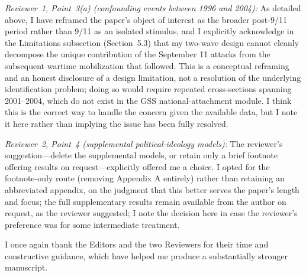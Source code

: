 \documentclass[11pt]{article}
\begin{document}
\textit{Reviewer~1, Point~3(a) (confounding events between 1996 and 2004):} As detailed above, I have reframed the paper's object of interest as the broader post-9/11 period rather than 9/11 as an isolated stimulus, and I explicitly acknowledge in the Limitations subsection (Section~5.3) that my two-wave design cannot cleanly decompose the unique contribution of the September 11 attacks from the subsequent wartime mobilization that followed. This is a conceptual reframing and an honest disclosure of a design limitation, not a resolution of the underlying identification problem; doing so would require repeated cross-sections spanning 2001--2004, which do not exist in the GSS national-attachment module. I think this is the correct way to handle the concern given the available data, but I note it here rather than implying the issue has been fully resolved.

\textit{Reviewer~2, Point~4 (supplemental political-ideology models):} The reviewer's suggestion---delete the supplemental models, or retain only a brief footnote offering results on request---explicitly offered me a choice. I opted for the footnote-only route (removing Appendix A entirely) rather than retaining an abbreviated appendix, on the judgment that this better serves the paper's length and focus; the full supplementary results remain available from the author on request, as the reviewer suggested; I note the decision here in case the reviewer's preference was for some intermediate treatment.

\vspace{12pt}
\noindent I once again thank the Editors and the two Reviewers for their time and constructive guidance, which have helped me produce a substantially stronger manuscript.



\end{document}

